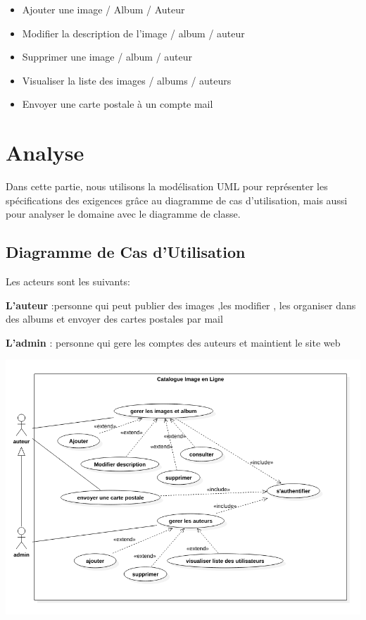 \documentclass[12pt]{article}
\begin{document}
	\begin{itemize}
	\item Ajouter une image / Album / Auteur
	\item Modifier la description de l'image / album / auteur 
	\item Supprimer une image / album / auteur
	\item Visualiser la liste des images / albums / auteurs 
	\item Envoyer une carte postale à un compte mail
	\end{itemize}
	
	
     

   
    
	
	
	
	\newpage
	\section{Analyse}
	Dans cette partie, nous utilisons la modélisation UML pour représenter les spécifications des exigences grâce au diagramme de cas d’utilisation, mais aussi pour analyser le domaine avec le diagramme de classe.
	\subsection{Diagramme de Cas d'Utilisation}
	Les acteurs sont les suivants:
	
	\textbf{L'auteur} :personne qui peut publier des images ,les modifier , les organiser dans des albums  et envoyer des cartes postales par mail
	
	\textbf{L'admin} : personne qui gere les comptes des auteurs  et maintient le site web 
	\vspace{1.5cm}
	
	
	\includegraphics[scale =0.5 ,width=\textwidth]{../usecase.png}
	
\end{document}
